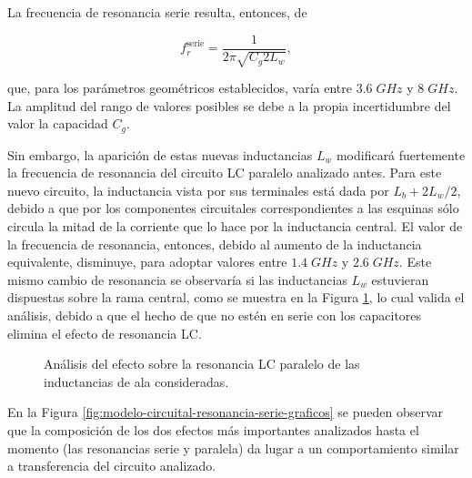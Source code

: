 La frecuencia de resonancia serie resulta, entonces, de

\begin{equation}
	f_r^{\text{serie}} = \frac{1}{2\pi \sqrt{C_g 2 L_w}},
\end{equation}

que, para los parámetros geométricos establecidos, varía entre $3.6\;GHz$ y $8\;GHz$. La amplitud del rango de valores posibles se debe a la propia incertidumbre del valor la capacidad $C_g$.

Sin embargo, la aparición de estas nuevas inductancias $L_{w}$ modificará fuertemente la frecuencia de resonancia del circuito LC paralelo analizado antes. Para este nuevo circuito, la inductancia vista por sus terminales está dada por $L_{b}+2 L_{w}/2$, debido a que por los componentes circuitales correspondientes a las esquinas sólo circula la mitad de la corriente que lo hace por la inductancia central. El valor de la frecuencia de resonancia, entonces, debido al aumento de la inductancia equivalente, disminuye, para adoptar valores entre $1.4\;GHz$ y $2.6\;GHz$. Este mismo cambio de resonancia se observaría si las inductancias $L_w$ estuvieran dispuestas sobre la rama central, como se muestra en la Figura \ref{fig:res-serie-p21p22}, lo cual valida el análisis, debido a que el hecho de que no estén en serie con los capacitores elimina el efecto de resonancia LC.

\begin{figure}[H]
	\centering 
	\hspace{0pt}
	\caption{Análisis del efecto sobre la resonancia LC paralelo de las inductancias de ala consideradas.}
	\label{fig:res-serie-p21p22}
\end{figure}

En la Figura \ref{fig:modelo-circuital-resonancia-serie-graficos} se pueden observar que la composición de los dos efectos más importantes analizados hasta el momento (las resonancias serie y paralela) da lugar a un comportamiento similar a transferencia del circuito analizado.

